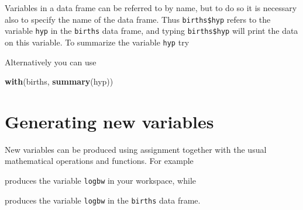\documentclass[
]{book}
\newenvironment{Shaded}{\begin{snugshade}}{\end{snugshade}}
\newcommand{\FunctionTok}[1]{\textcolor[rgb]{0.13,0.29,0.53}{\textbf{#1}}}
\newcommand{\NormalTok}[1]{#1}
\newcommand{\OtherTok}[1]{\textcolor[rgb]{0.56,0.35,0.01}{#1}}
\newcommand{\SpecialCharTok}[1]{\textcolor[rgb]{0.81,0.36,0.00}{\textbf{#1}}}
\begin{document}
Variables in a data frame can be referred to by name, but to do so
it is necessary also to specify the name of the data frame. Thus
\texttt{births\$hyp} refers to the variable \texttt{hyp} in the \texttt{births}
data frame, and typing \texttt{births\$hyp} will print the data on this
variable. To summarize the variable \texttt{hyp} try

\begin{Shaded}
\end{Shaded}

Alternatively you can use

\begin{Shaded}
\begin{Highlighting}[]
\FunctionTok{with}\NormalTok{(births, }\FunctionTok{summary}\NormalTok{(hyp))}
\end{Highlighting}
\end{Shaded}

\section{Generating new variables}\label{generating-new-variables}

New variables can be produced using assignment together with the usual
mathematical operations and functions. For example

\begin{Shaded}
\end{Shaded}

produces the variable \texttt{logbw} in your workspace, while

\begin{Shaded}
\end{Shaded}

produces the variable \texttt{logbw} in the \texttt{births} data frame.
\end{document}
